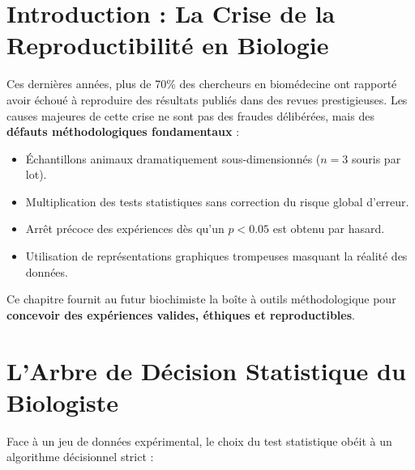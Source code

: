 \documentclass[11pt,a4paper]{article}
\begin{document}

\section{Introduction : La Crise de la Reproductibilité en Biologie}

Ces dernières années, plus de 70\% des chercheurs en biomédecine ont rapporté avoir échoué à reproduire des résultats publiés dans des revues prestigieuses. Les causes majeures de cette crise ne sont pas des fraudes délibérées, mais des \textbf{défauts méthodologiques fondamentaux} :
\begin{itemize}[leftmargin=*, label=\faAngleRight]
  \item Échantillons animaux dramatiquement sous-dimensionnés ($n = 3$ souris par lot).
  \item Multiplication des tests statistiques sans correction du risque global d'erreur.
  \item Arrêt précoce des expériences dès qu'un $p < 0.05$ est obtenu par hasard.
  \item Utilisation de représentations graphiques trompeuses masquant la réalité des données.
\end{itemize}

Ce chapitre fournit au futur biochimiste la boîte à outils méthodologique pour \textbf{concevoir des expériences valides, éthiques et reproductibles}.

\section{L'Arbre de Décision Statistique du Biologiste}

Face à un jeu de données expérimental, le choix du test statistique obéit à un algorithme décisionnel strict :
\end{document}
